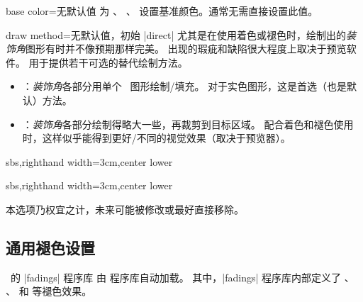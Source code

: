 \begin{vigTcbKey}[][doc new=2016-04-22]{base color}{=}{无默认值}
  为 、
  、
  设置基准颜色。通常无需直接设置此值。
\end{vigTcbKey}


\clearpage
\begin{vigTcbKey}[][doc new=2016-04-22]{draw method}{=\textbar{}}{无默认值，初始 |direct|}
  尤其是在使用着色或褪色时，绘制出的\emph{装饰角}图形有时并不像预期那样完美。
  出现的瑕疵和缺陷很大程度上取决于预览软件。
   用于提供若干可选的替代绘制方法。
  \begin{itemize}
  \item{}：\emph{装饰角}各部分用单个 \tikzname\ 图形绘制/填充。
    对于实色图形，这是首选（也是默认）方法。
  \item{}：\emph{装饰角}各部分绘制得略大一些，再裁剪到目标区域。
    配合着色和褪色使用时，这样似乎能得到更好/不同的视觉效果（取决于预览器）。
  \end{itemize}
\begin{dispExample*}{sbs,righthand width=3cm,center lower}
\end{dispExample*}
\begin{dispExample*}{sbs,righthand width=3cm,center lower}
\end{dispExample*}

\begin{marker}
本选项乃权宜之计，未来可能被修改或最好直接移除。
\end{marker}
\end{vigTcbKey}



\subsection{通用褪色设置}\label{subsec:vignettefading}

\tikzname\ 的 |fadings| 程序库 \cite{tantau:tikz_and_pgf}
由  程序库自动加载。
其中，|fadings| 程序库内部定义了
、
、
 和
 等褪色效果。

